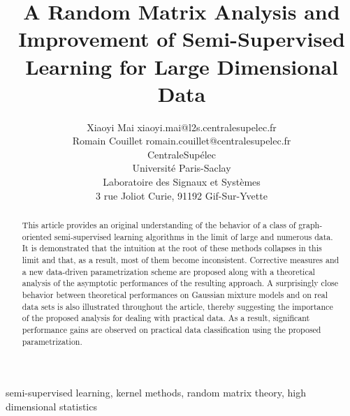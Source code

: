 \documentclass[twoside,11pt]{article}
\begin{document}
\title{A Random Matrix Analysis and Improvement of Semi-Supervised Learning for Large Dimensional Data}

\author{\name Xiaoyi Mai \email xiaoyi.mai@l2s.centralesupelec.fr \\ \name Romain Couillet \email romain.couillet@centralesupelec.fr \\
\addr CentraleSup\'elec \\
Universit\'e Paris-Saclay\\
Laboratoire des Signaux et Syst\`emes\\
3 rue Joliot Curie, 91192 Gif-Sur-Yvette
}



\maketitle


\begin{abstract}%
This article provides an original understanding of the behavior of a class of graph-oriented semi-supervised learning algorithms in the limit of large and numerous data. It is demonstrated that the intuition at the root of these methods collapses in this limit and that, as a result, most of them become inconsistent. Corrective measures and a new data-driven parametrization scheme are proposed along with a theoretical analysis of the asymptotic performances of the resulting approach. A surprisingly close behavior between theoretical performances on Gaussian mixture models and on real data sets is also illustrated throughout the article, thereby suggesting the importance of the proposed analysis for dealing with practical data. As a result, significant performance gains are observed on practical data classification using the proposed parametrization.
\end{abstract}

\begin{keywords}
semi-supervised learning, kernel methods, random matrix theory, high dimensional statistics
\end{keywords}
\end{document}
